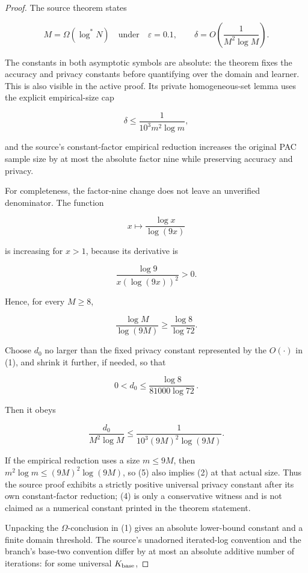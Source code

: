 \begin{proof}
The source theorem states

\[
M=\Omega(\log^*N)
\quad\text{under}\quad
\varepsilon=0.1,\qquad
\delta=O\!\left(\frac1{M^2\log M}\right).
\tag{1}
\]

The constants in both asymptotic symbols are absolute: the theorem fixes the accuracy and privacy constants before quantifying over the domain and learner. This is also visible in the active proof. Its private homogeneous-set lemma uses the explicit empirical-size cap

\[
\delta\le \frac1{10^3m^2\log m},
\tag{2}
\]

and the source's constant-factor empirical reduction increases the original
PAC sample size by at most the absolute factor nine while preserving accuracy
and privacy.

For completeness, the factor-nine change does not leave an unverified denominator. The function

\[
x\longmapsto \frac{\log x}{\log(9x)}
\]

is increasing for \(x>1\), because its derivative is

\[
\frac{\log 9}{x(\log(9x))^2}>0.
\]

Hence, for every \(M\ge8\),

\[
\frac{\log M}{\log(9M)}
\ge \frac{\log8}{\log72}.
\tag{3}
\]

Choose \(d_0\) no larger than the fixed privacy constant represented by the
\(O(\cdot)\) in (1), and shrink it further, if needed, so that

\[
0<d_0\le \frac{\log8}{81000\log72}\,.
\tag{4}
\]

Then it obeys

\[
\frac{d_0}{M^2\log M}
\le
\frac1{10^3(9M)^2\log(9M)}.
\tag{5}
\]

If the empirical reduction uses a size \(m\le9M\), then
\(m^2\log m\le(9M)^2\log(9M)\), so (5) also implies (2) at that actual
size. Thus the source proof exhibits a strictly positive universal privacy
constant after its own constant-factor reduction; (4) is only a conservative
witness and is not claimed as a numerical constant printed in the theorem
statement.

Unpacking the \(\Omega\)-conclusion in (1) gives an absolute lower-bound constant and a finite domain threshold. The source's unadorned iterated-log convention and the branch's base-two convention differ by at most an absolute additive number of iterations: for some universal \(K_{\rm base}\),


\end{proof}
